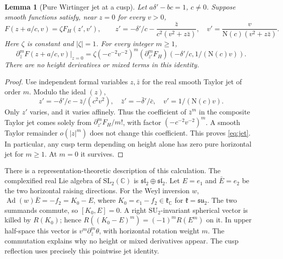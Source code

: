 \documentclass[11pt,a4paper]{article}
\numberwithin{equation}{section}
\newtheorem{lemma}[theorem]{Lemma}
\theoremstyle{definition}
\theoremstyle{remark}
\newcommand{\C}{\mathbb C}
\newcommand{\N}{\mathrm N}
\begin{document}
\begin{lemma}[Pure Wirtinger jet at a cusp]\label{lem:jet}
Let $a\delta'-bc=1$, $c\ne0$. Suppose smooth functions satisfy, near $z=0$ for every $v>0$,
\[
 F(z+a/c,v)=\zeta F_H(z',v'),\qquad
 z'=-\delta'/c-\frac{\bar z}{c^2(v^2+z\bar z)},\quad
 v'=\frac v{\N(c)(v^2+z\bar z)}.
\]
Here $\zeta$ is constant and $|\zeta|=1$. For every integer $m\ge1$,
\begin{equation}\label{eq:jet}
 \partial_{\bar z}^mF(z+a/c,v)\big|_{z=0}
 =\zeta(-c^{-2}v^{-2})^m
 (\partial_{z'}^mF_H)(-\delta'/c,1/(\N(c)v)).
\end{equation}
There are no height derivatives or mixed terms in this identity.
\end{lemma}
\begin{proof}
Use independent formal variables $z,\bar z$ for the real smooth Taylor jet of order $m$. Modulo the ideal $(z)$,
\[
 z'=-\delta'/c-\bar z/(c^2v^2),\quad
 \bar z'=-\bar\delta'/\bar c,\quad v'=1/(\N(c)v).
\]
Only $z'$ varies, and it varies affinely. Thus the coefficient of $\bar z^m$ in the composite Taylor jet comes solely from $\partial_{z'}^mF_H/m!$, with factor $(-c^{-2}v^{-2})^m$. A smooth Taylor remainder $o(|z|^m)$ does not change this coefficient. This proves \eqref{eq:jet}. In particular, any cusp term depending on height alone has zero pure horizontal jet for $m\ge1$. At $m=0$ it survives.
\end{proof}

There is a representation-theoretic description of this calculation. The complexified real Lie algebra of $\mathrm{SL}_2(\C)$ is $\mathfrak{sl}_2\oplus\mathfrak{sl}_2$. Let $E=e_1$ and $\bar E=e_2$ be the two horizontal raising directions. For the Weyl inversion $w$, $\operatorname{Ad}(w)\bar E=-f_2=K_0-E$, where $K_0=e_1-f_2\in\mathfrak k_\C$ for $\mathfrak k=\mathfrak{su}_2$. The two summands commute, so $[K_0,E]=0$. A right $\mathrm{SU}_2$-invariant spherical vector is killed by $R(K_0)$; hence $R((K_0-E)^m)=(-1)^mR(E^m)$ on it. In upper half-space this vector is $v^m\partial_{\bar z}^m\theta$, with horizontal rotation weight $m$. The commutation explains why no height or mixed derivatives appear. The cusp reflection uses precisely this pointwise jet identity.
\end{document}
